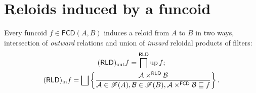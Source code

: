 \section{Reloids induced by a funcoid}

Every funcoid $f\in\mathsf{FCD}(A,B)$
induces a reloid from $A$ to $B$ in two ways, intersection of \emph{outward}
relations and union of \emph{inward} reloidal products of filters:
\begin{gather*}
\torldout f=\bigsqcap^{\mathsf{RLD}}\up f;\\
\torldin f=\bigsqcup\setcond{\mathcal{A}\times^{\mathsf{RLD}}\mathcal{B}}{\mathcal{A}\in\mathscr{F}(A),\mathcal{B}\in\mathscr{F}(B),\mathcal{A}\times^{\mathsf{FCD}}\mathcal{B}\sqsubseteq f}.
\end{gather*}

